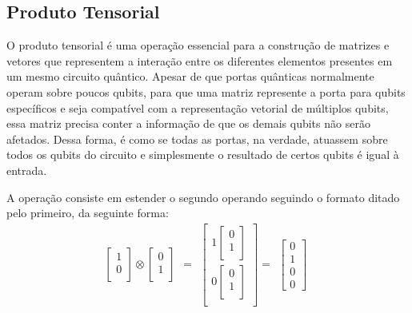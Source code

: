 \subsection{Produto Tensorial}\label{sub:kronecker}

O produto tensorial é uma operação essencial para a construção de matrizes e vetores que representem a interação entre os diferentes elementos presentes em um mesmo circuito quântico. Apesar de que portas quânticas normalmente operam sobre poucos qubits, para que uma matriz represente a porta para qubits específicos e seja compatível com a representação vetorial de múltiplos qubits, essa matriz precisa conter a informação de que os demais qubits não serão afetados. Dessa forma, é como se todas as portas, na verdade, atuassem sobre todos os qubits do circuito e simplesmente o resultado de certos qubits é igual à entrada.

A operação consiste em estender o segundo operando seguindo o formato ditado pelo primeiro, da seguinte forma:
\begin{equation}
    \begin{array}{c}
      \left[ \begin{array}{c}
        1 \\
        0 \\
      \end{array} \right]
      \otimes
      \left[ \begin{array}{c}
        0 \\
        1 \\
      \end{array} \right]
    \end{array}
    =
    \begin{array}{c}
      \left[ \begin{array}{c}
       1
        \left[ \begin{array}{c}
        0 \\
        1 \\
      \end{array} \right] \\
        0
        \left[ \begin{array}{c}
        0 \\
        1 \\
      \end{array} \right] \\
      \end{array} \right]
    =
    \begin{array}{c}
      \left[ \begin{array}{c}
        0 \\
        1 \\
        0 \\
        0
      \end{array} \right]
    \end{array}
  \end{array}
\end{equation}

